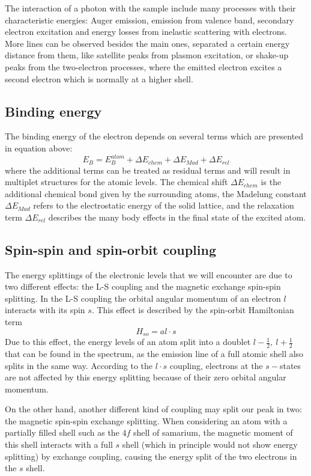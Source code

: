 \documentclass{article}
\begin{document}
The interaction of a photon with the sample include many processes with their characteristic energies: Auger emission, emission from valence band, secondary electron excitation and energy losses from inelastic scattering with electrons. More lines can be observed besides the main ones, separated a certain energy distance from them, like satellite peaks from plasmon excitation, or shake-up peaks from the two-electron processes, where the emitted electron excites a second electron which is normally at a higher shell.
\subsection{Binding energy}
The binding energy of the electron depends on several terms which are presented in equation above:
$$
E_B = E_B^{atom} + \Delta E_{chem} + \Delta E_{Mad} + \Delta E_{rel}
$$
where the additional terms can be treated as residual terms and will result in multiplet structures for the
atomic levels. The chemical shift $\Delta E_{chem}$ is the additional chemical bond given by the surrounding atoms, the Madelung constant $\Delta E_{Mad}$ refers to the electrostatic energy of the solid lattice, and the relaxation term $\Delta E_{rel}$ describes the many body effects in the final state of the excited atom.
\subsection{Spin-spin and spin-orbit coupling}
The energy splittings of the electronic levels that we will encounter are due to two different effects: the L-S coupling and the magnetic exchange spin-spin splitting. In the L-S coupling the orbital angular momentum of an electron $l$ interacts with its spin $s$. This effect is described by the spin-orbit Hamiltonian term
$$
H_{so} = al \cdot s
$$
Due to this effect, the energy levels of an atom split into a doublet $l - \frac{1}{2},\ l + \frac{1}{2}$ that can be found in the spectrum, as the emission line of a full atomic shell also splits in the same way. According to the $l \cdot s$ coupling, electrons at the $s-$states are not affected by this energy splitting because of their zero orbital angular momentum.

On the other hand, another different kind of coupling may split our peak in two: the magnetic spin-spin
exchange splitting. When considering an atom with a partially filled shell such as the $4f$ shell of samarium, the magnetic moment of this shell interacts with a full $s$ shell (which in principle would not show energy splitting) by exchange coupling, causing the energy split of the two electrons in the $s$ shell.
\end{document}
